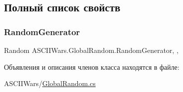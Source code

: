 \subsection{Полный список свойств}
\hypertarget{class_a_s_c_i_i_wars_1_1_global_random_a9d81774ce986f79fb427fd575463d63b}{}\label{class_a_s_c_i_i_wars_1_1_global_random_a9d81774ce986f79fb427fd575463d63b} 
\subsubsection{\texorpdfstring{Random\+Generator}{RandomGenerator}}
{\footnotesize\ttfamily Random A\+S\+C\+I\+I\+Wars.\+Global\+Random.\+Random\+Generator\hspace{0.3cm}{\ttfamily [static]}, {\ttfamily [get]}, {}}



Объявления и описания членов класса находятся в файле\+:\begin{DoxyCompactItemize}
\item 
A\+S\+C\+I\+I\+Wars/\hyperlink{_global_random_8cs}{Global\+Random.\+cs}\end{DoxyCompactItemize}
